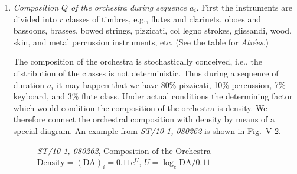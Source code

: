 \documentclass[letterpaper, 11pt]{article}
\begin{document}
\begin{enumerate}
        Let \( a_{i-1} \) be a sequence of duration \( a_{i-1} \), \( (\mathrm{DA})_{i-1} \) its
        density, and \( a_i \) the next sequence with duration \( a_i \) and density
        \( (\mathrm{DA})_i \). Density \( (\mathrm{DA})_i \) will be given by the formula:
        \[ (\mathrm{DA})_i = (\mathrm{DA})_{i-1} \mathrm{e}^{\pm x}\textrm{,} \]
        in which \( x \) is a segment of line drawn at random from a line segment \( s \) of length
        equal to \( (R - 0) \). The probability of \( x \) is given by
        \[
            P_x = \frac{2}{s} \left(1 - \frac{x}{s}\right) \, \mathrm{d}x
            \tag{See \hyperref[sec:appendix]{Appendix I}.}
        \]
        and finally,
        \[ N_{a_i} = (\mathrm{DA})_i a_i . \]
    \item
        \textit{Composition \( Q \) of the orchestra during sequence \( a_i \)}. First the
        instruments are divided into \( r \) classes of timbres, e.g., flutes and clarinets, oboes
        and bassoons, brasses, bowed strings, pizzicati, col legno strokes, glissandi, wood, skin,
        and metal percussion instruments, etc. (See the
        \hyperref[tbl:instruments]{table for \textit{Atrées}}.)

        \begin{table}[!htb]
            \centering
            \caption{
                Composition of the Orchestra for \textit{Atrées} (ST/10-3,060962) \\
                Timbre classes and instruments as on present input data
            }
            
            \label{tbl:instruments}
        \end{table}

        The composition of the orchestra is stochastically conceived, i.e., the distribution of the
        classes is not deterministic. Thus during a sequence of duration \( a_i \) it may happen
        that we have 80\% pizzicati, 10\% percussion, 7\% keyboard, and 3\% flute class. Under
        actual conditions the determining factor which would condition the composition of the
        orchestra is density. We therefore connect the orchestral composition with density by means
        of a special diagram. An example from \textit{ST/10-1, 080262} is shown in
        \hyperref[fig:composition]{Fig.\ V-2}.

        \begin{figure}[htb]
            \centering
            
            \caption{
                \textit{ST/10-1, 080262}, Composition of the Orchestra \\
                \( \text{Density} = (\mathrm{DA})_i = 0.11 \mathrm{e}^U \),
                \( U = \log_e {\mathrm{DA}/0.11} \)
            }
            \label{fig:composition}
        \end{figure}


\end{enumerate}
\end{document}
